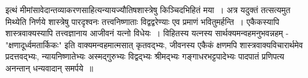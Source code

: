 {इत्थं मीमांसावेदान्तव्याकरणसाहित्यन्यायज्यौतिषशास्त्रेषु किञ्चिदभिहितं मया~। अत्र यदुक्तं तत्सत्यमुत मिथ्येति निर्णये शास्त्रेषु पारदृश्वनः तत्त्वनिष्णाताः विद्वद्वरेण्याः एव प्रमाणं भवितुमर्हन्ति~। एकैकस्यापि शास्त्रवाक्यस्यापि तत्त्वज्ञानाय आजीवनं यत्नो विधेयः~। विहितस्य यत्नस्य सार्थक्यमन्वहमनुभवन्नहम् - "क्षणादूर्ध्वमतार्किकः" इति वाक्यमन्वहमात्मसात् कृतवद्भ्यः, जीवनस्य एकैकं क्षणमपि शास्त्रवाक्यविचारार्थमेव प्रदत्तवद्भ्यः, न्यायनिष्णातेभ्यः अस्मद्गुरुभ्यः विद्वद्भ्यः श्रीमद्भ्यः गङ्गाधरभट्टपादेभ्यः पादपातं प्रणिपत्य अनन्तान् धन्यवादान् समर्पये~॥
					
\articleend
}
